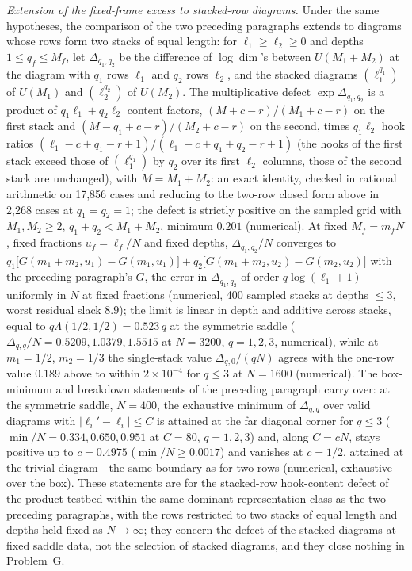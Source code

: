 \emph{Extension of the fixed-frame excess to stacked-row diagrams.} Under the same hypotheses, the comparison of the two preceding paragraphs extends to diagrams whose rows form two stacks of equal length: for \(\ell_1\ge\ell_2\ge0\) and depths \(1\le q_f\le M_f\), let \(\Delta_{q_1,q_2}\) be the difference of \(\log\dim\)'s between \(U(M_1+M_2)\) at the diagram with \(q_1\) rows \(\ell_1\) and \(q_2\) rows \(\ell_2\), and the stacked diagrams \((\ell_1^{q_1})\) of \(U(M_1)\) and \((\ell_2^{q_2})\) of \(U(M_2)\). The multiplicative defect \(\exp\Delta_{q_1,q_2}\) is a product of \(q_1\ell_1+q_2\ell_2\) content factors, \((M+c-r)/(M_1+c-r)\) on the first stack and \((M-q_1+c-r)/(M_2+c-r)\) on the second, times \(q_1\ell_2\) hook ratios \((\ell_1-c+q_1-r+1)/(\ell_1-c+q_1+q_2-r+1)\) (the hooks of the first stack exceed those of \((\ell_1^{q_1})\) by \(q_2\) over its first \(\ell_2\) columns, those of the second stack are unchanged), with \(M=M_1+M_2\): an exact identity, checked in rational arithmetic on 17,856 cases and reducing to the two-row closed form above in 2,268 cases at \(q_1=q_2=1\); the defect is strictly positive on the sampled grid with \(M_1,M_2\ge2\), \(q_1+q_2<M_1+M_2\), minimum \(0.201\) (numerical). At fixed \(M_f=m_fN\), fixed fractions \(u_f=\ell_f/N\) and fixed depths, \(\Delta_{q_1,q_2}/N\) converges to \(q_1\bigl[G(m_1+m_2,u_1)-G(m_1,u_1)\bigr]+q_2\bigl[G(m_1+m_2,u_2)-G(m_2,u_2)\bigr]\) with the preceding paragraph's \(G\), the error in \(\Delta_{q_1,q_2}\) of order \(q\log(\ell_1+1)\) uniformly in \(N\) at fixed fractions (numerical, 400 sampled stacks at depths \(\le3\), worst residual slack \(8.9\)); the limit is linear in depth and additive across stacks, equal to \(q\Lambda(1/2,1/2)=0.523\,q\) at the symmetric saddle (\(\Delta_{q,q}/N=0.5209,1.0379,1.5515\) at \(N=3200\), \(q=1,2,3\), numerical), while at \(m_1=1/2\), \(m_2=1/3\) the single-stack value \(\Delta_{q,0}/(qN)\) agrees with the one-row value \(0.189\) above to within \(2\times10^{-4}\) for \(q\le3\) at \(N=1600\) (numerical). The box-minimum and breakdown statements of the preceding paragraph carry over: at the symmetric saddle, \(N=400\), the exhaustive minimum of \(\Delta_{q,q}\) over valid diagrams with \(|\ell_i'-\ell_i|\le C\) is attained at the far diagonal corner for \(q\le3\) (\(\min/N=0.334,0.650,0.951\) at \(C=80\), \(q=1,2,3\)) and, along \(C=cN\), stays positive up to \(c=0.4975\) (\(\min/N\ge0.0017\)) and vanishes at \(c=1/2\), attained at the trivial diagram - the same boundary as for two rows (numerical, exhaustive over the box). These statements are for the stacked-row hook-content defect of the product testbed within the same dominant-representation class as the two preceding paragraphs, with the rows restricted to two stacks of equal length and depths held fixed as \(N\to\infty\); they concern the defect of the stacked diagrams at fixed saddle data, not the selection of stacked diagrams, and they close nothing in Problem~G.

